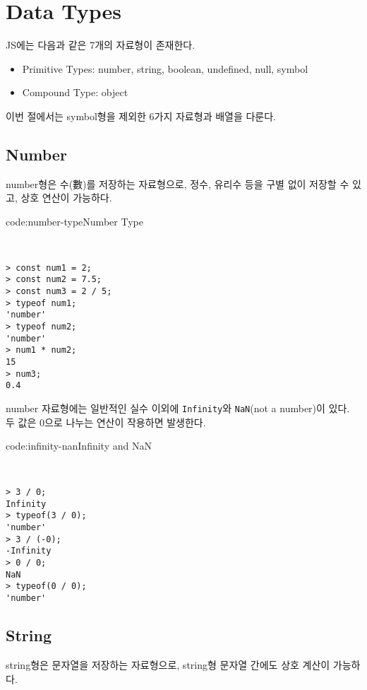 \section{Data Types} \label{sect:data-types}

JS에는 다음과 같은 7개의 자료형이 존재한다.

\begin{itemize}
    \item Primitive Types: number, string, boolean, undefined, null, symbol
    \item Compound Type: object
\end{itemize}

이번 절에서는 symbol형을 제외한 6가지 자료형과 배열을 다룬다.

\subsection*{Number}

number형은 수(數)를 저장하는 자료형으로, 정수, 유리수 등을 구별 없이 저장할 수 있고, 상호 연산이 가능하다.

\begin{codeenv}{code:number-type}{Number Type}\begin{verbatim}


> const num1 = 2;
> const num2 = 7.5;
> const num3 = 2 / 5;
> typeof num1;
'number'
> typeof num2;
'number'
> num1 * num2;
15
> num3;
0.4
\end{verbatim}
\end{codeenv}

number 자료형에는 일반적인 실수 이외에 \texttt{Infinity}와 \texttt{NaN}(not a number)이 있다. 두 값은 0으로 나누는 연산이 작용하면 발생한다.

\begin{codeenv}{code:infinity-nan}{Infinity and NaN}\begin{verbatim}


> 3 / 0;
Infinity
> typeof(3 / 0);
'number'
> 3 / (-0);
-Infinity
> 0 / 0;
NaN
> typeof(0 / 0);
'number'
\end{verbatim}
\end{codeenv}
\newpage

\subsection*{String}

string형은 문자열을 저장하는 자료형으로, string형 문자열 간에도 상호 계산이 가능하다.

